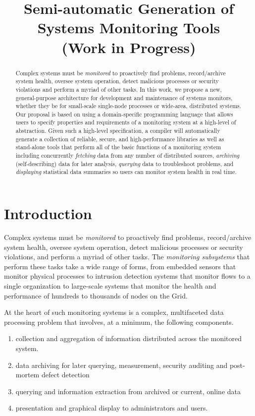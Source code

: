 \documentclass{sigplanconf}
\title{Semi-automatic Generation of Systems Monitoring Tools \\ (Work in Progress)}
\begin{document}
\maketitle{}

\begin{abstract}
Complex systems must be {\em monitored} to proactively find problems,
record/archive system health, oversee system operation, detect
malicious processes or security violations and perform a myriad of other 
tasks.  In this work, we propose a new, general-purpose architecture 
for development and maintenance of systems monitors, whether they
be for small-scale single-node processes or wide-area, 
distributed systems.  Our proposal is based on using 
a domain-specific programming language that allows users to specify
properties and requirements of a monitoring system at a high-level
of abstraction.  Given such a high-level specification,
a compiler will automatically generate a collection of
reliable, secure, and high-performance libraries as well as stand-alone
tools that perform all of the basic functions of a monitoring system
including concurrently {\em fetching} data from any number of distributed
sources, {\em archiving} (self-describing) data for later analysis,
{\em querying} data to troubleshoot problems, and {\em displaying}
statistical data summaries so users can monitor system health in real time.
\end{abstract}

\section{Introduction}
\label{sec:intro}

Complex systems must be {\em monitored} to proactively find problems,
record/archive system health, oversee system operation, detect
malicious processes or security violations, and perform a myriad of
other tasks.  The {\em monitoring subsystems} that perform these tasks
take a wide range of forms, from embedded sensors that monitor
physical processes to intrusion detection systems that monitor flows
to a single organization to large-scale systems that monitor the
health and performance of hundreds to thousands of nodes on the Grid.

At the heart of such monitoring systems is a complex, multifaceted
data processing problem that involves, at a minimum, the following
components.
\begin{enumerate}
\item collection and aggregation of information 
distributed across the monitored system.
\item data archiving for later querying, measurement, security auditing and 
post-mortem defect detection
\item querying and information extraction from archived or current, online data
\item presentation and graphical display to administrators and users.
\end{enumerate}
\end{document}
